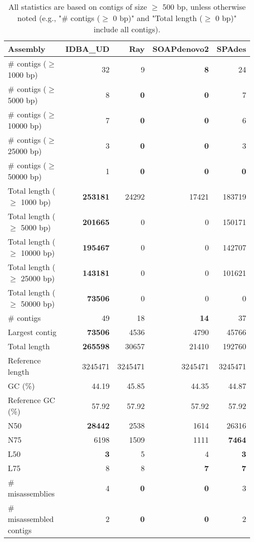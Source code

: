 \documentclass[12pt,a4paper]{article}
\begin{document}
\begin{table}[ht]
\begin{center}
\caption{All statistics are based on contigs of size $\geq$ 500 bp, unless otherwise noted (e.g., "\# contigs ($\geq$ 0 bp)" and "Total length ($\geq$ 0 bp)" include all contigs).}
\begin{tabular}{|l*{4}{|r}|}
\hline
Assembly & IDBA\_UD & Ray & SOAPdenovo2 & SPAdes \\ \hline
\# contigs ($\geq$ 1000 bp) & 32 & 9 & {\bf 8} & 24 \\ \hline
\# contigs ($\geq$ 5000 bp) & 8 & {\bf 0} & {\bf 0} & 7 \\ \hline
\# contigs ($\geq$ 10000 bp) & 7 & {\bf 0} & {\bf 0} & 6 \\ \hline
\# contigs ($\geq$ 25000 bp) & 3 & {\bf 0} & {\bf 0} & 3 \\ \hline
\# contigs ($\geq$ 50000 bp) & 1 & {\bf 0} & {\bf 0} & {\bf 0} \\ \hline
Total length ($\geq$ 1000 bp) & {\bf 253181} & 24292 & 17421 & 183719 \\ \hline
Total length ($\geq$ 5000 bp) & {\bf 201665} & 0 & 0 & 150171 \\ \hline
Total length ($\geq$ 10000 bp) & {\bf 195467} & 0 & 0 & 142707 \\ \hline
Total length ($\geq$ 25000 bp) & {\bf 143181} & 0 & 0 & 101621 \\ \hline
Total length ($\geq$ 50000 bp) & {\bf 73506} & 0 & 0 & 0 \\ \hline
\# contigs & 49 & 18 & {\bf 14} & 37 \\ \hline
Largest contig & {\bf 73506} & 4536 & 4790 & 45766 \\ \hline
Total length & {\bf 265598} & 30657 & 21410 & 192760 \\ \hline
Reference length & 3245471 & 3245471 & 3245471 & 3245471 \\ \hline
GC (\%) & 44.19 & 45.85 & 44.35 & 44.87 \\ \hline
Reference GC (\%) & 57.92 & 57.92 & 57.92 & 57.92 \\ \hline
N50 & {\bf 28442} & 2538 & 1614 & 26316 \\ \hline
N75 & 6198 & 1509 & 1111 & {\bf 7464} \\ \hline
L50 & {\bf 3} & 5 & 4 & {\bf 3} \\ \hline
L75 & 8 & 8 & {\bf 7} & {\bf 7} \\ \hline
\# misassemblies & 4 & {\bf 0} & {\bf 0} & 3 \\ \hline
\# misassembled contigs & 2 & {\bf 0} & {\bf 0} & 2 \\ \hline

\end{tabular}
\end{center}
\end{table}
\end{document}
